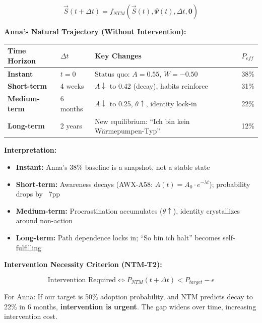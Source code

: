 \begin{equation}
\vec{S}(t+\Delta t) = f_{NTM}(\vec{S}(t), \Psi(t), \Delta t, \mathbf{0})
\end{equation}

\textbf{Anna's Natural Trajectory (Without Intervention):}

\begin{center}
\renewcommand{\arraystretch}{1.3}
\begin{tabular}{@{}llll@{}}
\toprule
\textbf{Time Horizon} & \textbf{$\Delta t$} & \textbf{Key Changes} & \textbf{$P_{eff}$} \\
\midrule
\textbf{Instant} & $t = 0$ & Status quo: $A = 0.55$, $W = -0.50$ & 38\% \\
\textbf{Short-term} & 4 weeks & $A \downarrow$ to 0.42 (decay), habits reinforce & 31\% \\
\textbf{Medium-term} & 6 months & $A \downarrow$ to 0.25, $\theta \uparrow$, identity lock-in & 22\% \\
\textbf{Long-term} & 2 years & New equilibrium: ``Ich bin kein Wärmepumpen-Typ'' & 12\% \\
\bottomrule
\end{tabular}
\end{center}

\textbf{Interpretation:}
\begin{itemize}[nosep]
\item \textbf{Instant:} Anna's 38\% baseline is a snapshot, not a stable state
\item \textbf{Short-term:} Awareness decays (AWX-A58: $A(t) = A_0 \cdot e^{-\lambda t}$); probability drops by ~7pp
\item \textbf{Medium-term:} Procrastination accumulates ($\theta \uparrow$), identity crystallizes around non-action
\item \textbf{Long-term:} Path dependence locks in; ``So bin ich halt'' becomes self-fulfilling
\end{itemize}

\textbf{Intervention Necessity Criterion (NTM-T2):}

\begin{equation}
\text{Intervention Required} \Leftrightarrow P_{NTM}(t + \Delta t) < P_{target} - \epsilon
\end{equation}

For Anna: If our target is 50\% adoption probability, and NTM predicts decay to 22\% in 6 months, \textbf{intervention is urgent}. The gap widens over time, increasing intervention cost.

